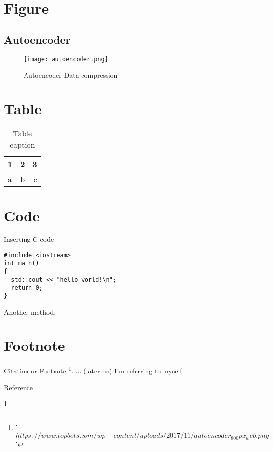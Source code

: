 \documentclass[a4paper]{article}
\begin{document}
\section{Figure}

\subsection{Autoencoder}

\begin{figure}[h]
\caption{Autoencoder Data compression }
\label{fig:whatever}
\texttt{[image: autoencoder.png]}
\end{figure}

\section{Table}

\begin{table}[h!] %

\centering
\caption{Table caption}
\label{tab:table1}

\begin{tabular}{l|c||r}
1 & 2 & 3 \\
	\hline
a & b & c \\

\end{tabular}
\end{table}

\section{Code}
Inserting C code 

\begin{verbatim}
#include <iostream>
int main()
{
  std::cout << "hello world!\n";
  return 0;
}
\end{verbatim}

Another method:

\section{Footnote}

Citation or Footnote 
\footnote{\label{myfootnote}'$https://www.topbots.com/wp-content/uploads/2017/11/autoencoder_800px_web.png$'}.
... (later on)
I'm referring to myself 

Reference

\ref{myfootnote}
\end{document}
